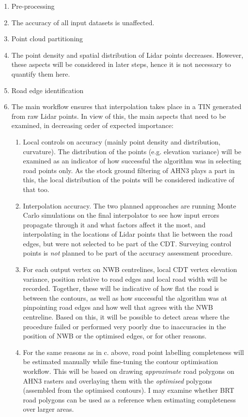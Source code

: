 \begin{enumerate}
    \item Pre-processing
    \item[] The accuracy of all input datasets is unaffected.
    \item Point cloud partitioning
    \item[] The point density and spatial distribution of Lidar points decreases. However, these aspects will be considered in later steps, hence it is not necessary to quantify them here.
    \item Road edge identification
    \item[] The main workflow ensures that interpolation takes place in a TIN generated from raw Lidar points. In view of this, the main aspects that need to be examined, in decreasing order of expected importance:
    \begin{enumerate}
        \item Local controls on accuracy (mainly point density and distribution, curvature). The distribution of the points (e.g. elevation variance) will be examined as an indicator of how successful the algorithm was in selecting road points only. As the stock ground filtering of AHN3 plays a part in this, the local distribution of the points will be considered indicative of that too.
        \item Interpolation accuracy. The two planned approaches are running Monte Carlo simulations on the final interpolator to see how input errors propagate through it and what factors affect it the most, and interpolating in the locations of Lidar points that lie between the road edges, but were not selected to be part of the CDT. Surveying control points is \textit{not} planned to be part of the accuracy assessment procedure.
        \item For each output vertex on NWB centrelines, local CDT vertex elevation variance, position relative to road edges and local road width will be recorded. Together, these will be indicative of how flat the road is between the contours, as well as how successful the algorithm was at pinpointing road edges and how well that agrees with the NWB centreline. Based on this, it will be possible to detect areas where the procedure failed or performed very poorly due to inaccuracies in the position of NWB or the optimised edges, or for other reasons.
        \item For the same reasons as in c. above, road point labelling completeness will be estimated manually while fine-tuning the contour optimisation workflow. This will be based on drawing \textit{approximate} road polygons on AHN3 rasters and overlaying them with the \textit{optimised} polygons (assembled from the optimised contours). I may examine whether BRT road polygons can be used as a reference when estimating completeness over larger areas.

\end{enumerate}
\end{enumerate}

